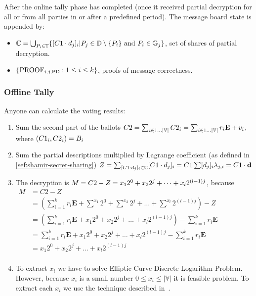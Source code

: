 \documentclass{article}
\begin{document}
After the online tally phase has completed (once it received partial decryption for all \SetOfEncryptedPartialDecryptionKeys{} or from all parties in \SetOfFDKG{} or after a predefined period). The message board state is appended by:
\begin{itemize}
    \item $\mathbb{C} = \bigcup_{P_i \in \mathbb{T}} \{ [C1 \cdot d_{j}]_{i} | P_{j} \in \mathbb{D} \setminus \{P_{i}\} \text{ and } P_{i} \in \mathbb{G}_{j}\}$, set of shares of partial decryption.
    \item $\{\textrm{PROOF}_{i,j,\textrm{PD}} : 1 \leq i \leq k\}$, proofs of message correctness. %
\end{itemize}

\subsubsection{Offline Tally}

Anyone can calculate the voting results:
\begin{enumerate}
    \item Sum the second part of the ballots $C2 = \sum_{i \in 1 \dots |\mathbb{V}|} C2_{i} = \sum_{i \in 1 \dots |\mathbb{V}|} r_{i} \textbf{E} + v_{i}$, where $(C1_{i},C2_{i})=B_{i}$ %
    
    \item Sum the partial descriptions multiplied by Lagrange coefficient (as defined in \ref{sef:shamir-secret-sharing}) $Z=\sum_{[C1 \cdot d_{j}]_{i} \in \mathbb{C}} [C1 \cdot d_{j}]_{i} = C1 \sum  [d_{j}]_{i} \lambda_{j,i} = C1 \cdot \textbf{d}{}$
    
    \item The decryption is $M=C2{} - Z=x_1 2^0 + x_2 2^j + \dots + x_l 2^{(l-1)j}$, because $\begin{aligned} M&=C2-Z \\
        &= (\sum_{i=1}^k r_{i} \mathbf{E} + \sum^{x_1} 2^0 + \sum^{x_2} 2^j + \dots + \sum^{x_l} 2^{(l-1)j}) - Z\\
        &= (\sum_{i=1}^k r_{i} \mathbf{E} + x_1 2^0 + x_2 2^j + \dots + x_l 2^{(l-1)j}) - \sum_{i=1}^k r_{i} \mathbf{E}\\
        &= \sum_{i=1}^k r_{i} \mathbf{E} + x_1 2^0 + x_2 2^j + \dots + x_l 2^{(l-1)j} - \sum_{i=1}^k r_{i} \mathbf{E}\\
        &= x_1 2^0 + x_2 2^j + \dots + x_l 2^{(l-1)j}\\
        \end{aligned}$
    \item To extract $x_i$ we have to solve Elliptic-Curve Discrete Logarithm Problem. However, because $x_i$ is a small number $0 \leq x_i \leq |\mathbb{V}|$ it is feasible problem. To extract each $x_i$ we use the technique described in~\cite{haoAnonymousVotingTworound2010}.
\end{enumerate}
\end{document}
